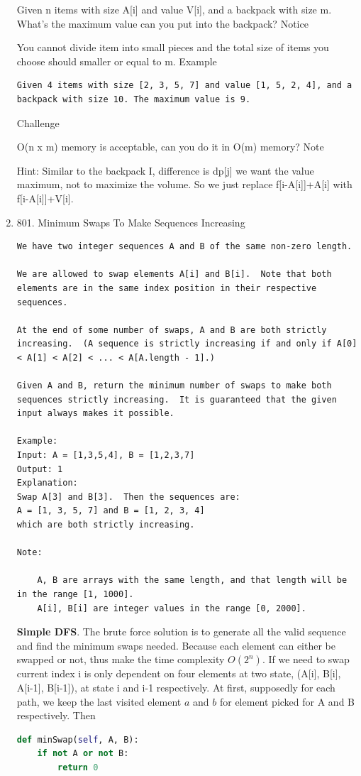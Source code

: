 \documentclass[../main.tex]{subfiles}
\begin{document}
\begin{enumerate}
Given n items with size A[i] and value V[i], and a backpack with size m. What's the maximum value can you put into the backpack?
Notice

You cannot divide item into small pieces and the total size of items you choose should smaller or equal to m.
Example
\begin{lstlisting}
Given 4 items with size [2, 3, 5, 7] and value [1, 5, 2, 4], and a backpack with size 10. The maximum value is 9.
\end{lstlisting}
Challenge

O(n x m) memory is acceptable, can you do it in O(m) memory?
Note

Hint: Similar to the backpack I, difference is dp[j] we want the value maximum, not to maximize the volume. So we just replace f[i-A[i]]+A[i] with f[i-A[i]]+V[i].


\item 801. Minimum Swaps To Make Sequences Increasing
\begin{lstlisting}
We have two integer sequences A and B of the same non-zero length.

We are allowed to swap elements A[i] and B[i].  Note that both elements are in the same index position in their respective sequences.

At the end of some number of swaps, A and B are both strictly increasing.  (A sequence is strictly increasing if and only if A[0] < A[1] < A[2] < ... < A[A.length - 1].)

Given A and B, return the minimum number of swaps to make both sequences strictly increasing.  It is guaranteed that the given input always makes it possible.

Example:
Input: A = [1,3,5,4], B = [1,2,3,7]
Output: 1
Explanation: 
Swap A[3] and B[3].  Then the sequences are:
A = [1, 3, 5, 7] and B = [1, 2, 3, 4]
which are both strictly increasing.

Note:

    A, B are arrays with the same length, and that length will be in the range [1, 1000].
    A[i], B[i] are integer values in the range [0, 2000].
\end{lstlisting}
\textbf{Simple DFS}. The brute force solution is to generate all the valid sequence and find the minimum swaps needed. Because each element can either be swapped or not, thus make the time complexity $O(2^n)$. If we need to swap current index i is only dependent on four elements at two state, (A[i], B[i], A[i-1], B[i-1]), at state i and i-1 respectively. At first, supposedly for each path, we keep the last visited element $a$ and $b$ for element picked for A and B respectively. Then
\begin{lstlisting}[language = Python]
def minSwap(self, A, B):
    if not A or not B:
        return 0
    

\end{lstlisting}
\end{enumerate}
\end{document}
